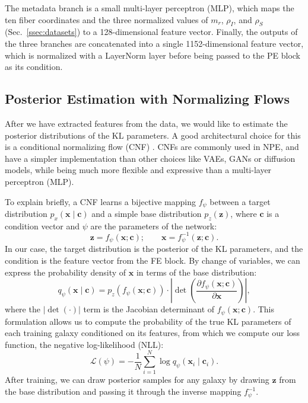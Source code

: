 The metadata branch is a small multi-layer perceptron (MLP), which maps the ten fiber coordinates and the three normalized values of $m_r$, $\rho_I$, and $\rho_S$ (Sec.~\ref{ssec:datasets}) to a 128-dimensional feature vector. Finally, the outputs of the three branches are concatenated into a single 1152-dimensional feature vector, which is normalized with a LayerNorm layer before being passed to the PE block as its condition.

\subsection{Posterior Estimation with Normalizing Flows}
\label{ssec:npe}
After we have extracted features from the data, we would like to estimate the posterior distributions of the KL parameters. A good architectural choice for this is a conditional normalizing flow (CNF) \citep{NormalizingFlows, CNF}. CNFs are commonly used in NPE, and have a simpler implementation than other choices like VAEs, GANs or diffusion models, while being much more flexible and expressive than a multi-layer perceptron (MLP).

To explain briefly, a CNF learns a bijective mapping $f_\psi$ between a target distribution $p_x(\mathbf{x \mid c})$ and a simple base distribution $p_z(\mathbf{z})$, where $\mathbf{c}$ is a condition vector and $\psi$ are the parameters of the network:
\begin{equation}
\label{eqn:cnf-transform}
    \mathbf{z} = f_\psi(\mathbf{x}; \mathbf{c}); \qquad \mathbf{x} = f_\psi^{-1}(\mathbf{z}; \mathbf{c}).
\end{equation}
In our case, the target distribution is the posterior of the KL parameters, and the condition is the feature vector from the FE block. By change of variables, we can express the probability density of $\mathbf{x}$ in terms of the base distribution:
\begin{equation}
\label{eqn:cnf-cv}
    q_\psi(\mathbf{x \mid c}) = p_z\left(f_\psi(\mathbf{x}; \mathbf{c})\right) \cdot \left| \det\left(\frac{\partial f_\psi(\mathbf{x}; \mathbf{c})}{\partial\mathbf{x}}\right)\right| ,
\end{equation}
where the $ |\det(\cdot)| $ term is the Jacobian determinant of $f_\psi(\mathbf{x}; \mathbf{c})$. This formulation allows us to compute the probability of the true KL parameters of each training galaxy conditioned on its features, from which we compute our loss function, the negative log-likelihood (NLL):
\begin{equation}
\label{eqn:loss-unweighted}
    \mathcal{L}(\psi) = -\frac{1}{N}\sum_{i=1}^N\log q_\psi(\mathbf{x}_i \mid \mathbf{c}_i).
\end{equation}
After training, we can draw posterior samples for any galaxy by drawing $\mathbf{z}$ from the base distribution and passing it through the inverse mapping $f_\psi^{-1}$.

